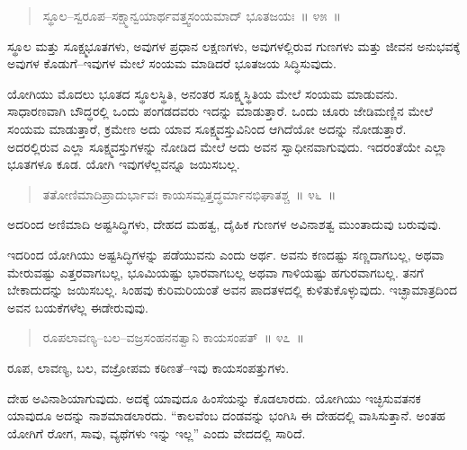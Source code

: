 \vspace{-0.3cm}

\begin{verse}
ಸ್ಥೂಲ–ಸ್ವರೂಪ–ಸಕ್ಷ್ಮಾನ್ವಯಾರ್ಥವತ್ತ್ವಸಂಯಮಾದ್​ ಭೂತಜಯಃ~॥ ೪೫~॥
\end{verse}

\vspace{-0.3cm}

ಸ್ಥೂಲ ಮತ್ತು ಸೂಕ್ಷ್ಮಭೂತಗಳು, ಅವುಗಳ ಪ್ರಧಾನ ಲಕ್ಷಣಗಳು, ಅವುಗಳಲ್ಲಿರುವ ಗುಣಗಳು ಮತ್ತು ಜೀವನ ಅನುಭವಕ್ಕೆ ಅವುಗಳ ಕೊಡುಗೆ–ಇವುಗಳ ಮೇಲೆ ಸಂಯಮ ಮಾಡಿದರೆ ಭೂತಜಯ ಸಿದ್ಧಿಸುವುದು. 

ಯೋಗಿಯು ಮೊದಲು ಭೂತದ ಸ್ಥೂಲಸ್ಥಿತಿ, ಅನಂತರ ಸೂಕ್ಷ್ಮಸ್ಥಿತಿಯ ಮೇಲೆ ಸಂಯಮ ಮಾಡುವನು. ಸಾಧಾರಣವಾಗಿ ಬೌದ್ಧರಲ್ಲಿ ಒಂದು ಪಂಗಡದವರು ಇದನ್ನು ಮಾಡುತ್ತಾರೆ. ಒಂದು ಚೂರು ಜೇಡಿಮಣ್ಣಿನ ಮೇಲೆ ಸಂಯಮ ಮಾಡುತ್ತಾರೆ, ಕ್ರಮೇಣ ಅದು ಯಾವ ಸೂಕ್ಷ್ಮವಸ್ತುವಿನಿಂದ ಆಗಿದೆಯೋ ಅದನ್ನು ನೋಡುತ್ತಾರೆ. ಅದರಲ್ಲಿರುವ ಎಲ್ಲಾ ಸೂಕ್ಷ್ಮವಸ್ತುಗಳನ್ನು ನೋಡಿದ ಮೇಲೆ ಅದು ಅವನ ಸ್ವಾಧೀನವಾಗುವುದು. ಇದರಂತೆಯೇ ಎಲ್ಲಾ ಭೂತಗಳೂ ಕೂಡ. ಯೋಗಿ ಇವುಗಳೆಲ್ಲವನ್ನೂ ಜಯಿಸಬಲ್ಲ. 

\vspace{-0.3cm}

\begin{verse}
ತತೋಣಿಮಾದಿಪ್ರಾದುರ್ಭಾವಃ ಕಾಯಸಮ್ಪತ್ತದ್ಧರ್ಮಾನಭಿಘಾತಶ್ಚ~॥ ೪೬~॥
\end{verse}

\vspace{-0.3cm}

ಅದರಿಂದ ಅಣಿಮಾದಿ ಅಷ್ಟಸಿದ್ಧಿಗಳು, ದೇಹದ ಮಹತ್ವ, ದೈಹಿಕ ಗುಣಗಳ ಅವಿನಾಶತ್ವ ಮುಂತಾದುವು ಬರುವುವು. 

ಇದರಿಂದ ಯೋಗಿಯು ಅಷ್ಟಸಿದ್ಧಿಗಳನ್ನು ಪಡೆಯುವನು ಎಂದು ಅರ್ಥ. ಅವನು ಕಣದಷ್ಟು ಸಣ್ಣದಾಗಬಲ್ಲ, ಅಥವಾ ಮೇರುವಷ್ಟು ಎತ್ತರವಾಗಬಲ್ಲ, ಭೂಮಿಯಷ್ಟು ಭಾರವಾಗಬಲ್ಲ ಅಥವಾ ಗಾಳಿಯಷ್ಟು ಹಗುರವಾಗಬಲ್ಲ. ತನಗೆ ಬೇಕಾದುದನ್ನು ಜಯಿಸಬಲ್ಲ. ಸಿಂಹವು ಕುರಿಮರಿಯಂತೆ ಅವನ ಪಾದತಳದಲ್ಲಿ ಕುಳಿತುಕೊಳ್ಳುವುದು. ಇಚ್ಛಾಮಾತ್ರದಿಂದ ಅವನ ಬಯಕೆಗಳೆಲ್ಲ ಈಡೇರುವುವು. 

\vspace{-0.3cm}

\begin{verse}
ರೂಪಲಾವಣ್ಯ–ಬಲ–ವಜ್ರಸಂಹನನತ್ವಾನಿ ಕಾಯಸಂಪತ್​~॥ ೪೭~॥
\end{verse}

\vspace{-0.3cm}

ರೂಪ, ಲಾವಣ್ಯ, ಬಲ, ವಜ್ರೋಪಮ ಕಠಿಣತೆ–ಇವು ಕಾಯಸಂಪತ್ತುಗಳು. 

ದೇಹ ಅವಿನಾಶಿಯಾಗುವುದು. ಅದಕ್ಕೆ ಯಾವುದೂ ಹಿಂಸೆಯನ್ನು ಕೊಡಲಾರದು. ಯೋಗಿಯು ಇಚ್ಛಿಸುವತನಕ ಯಾವುದೂ ಅದನ್ನು ನಾಶಮಾಡಲಾರದು. “ಕಾಲವೆಂಬ ದಂಡವನ್ನು ಭಂಗಿಸಿ ಈ ದೇಹದಲ್ಲಿ ವಾಸಿಸುತ್ತಾನೆ. ಅಂತಹ ಯೋಗಿಗೆ ರೋಗ, ಸಾವು, ವ್ಯಥೆಗಳು ಇನ್ನು ಇಲ್ಲ” ಎಂದು ವೇದದಲ್ಲಿ ಸಾರಿದೆ. 

\vspace{-0.3cm}

